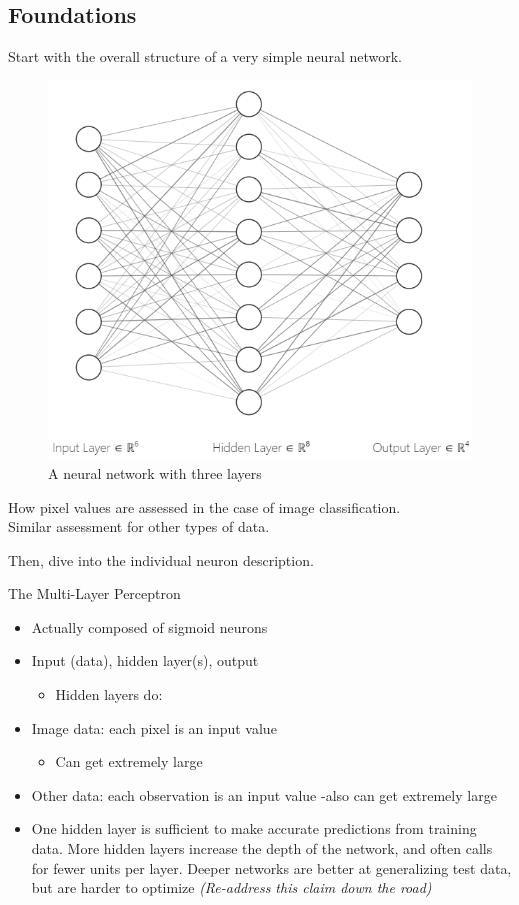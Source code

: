 

\hypertarget{foundations}{%
\subsection{Foundations}\label{foundations}}

Start with the overall structure of a very simple neural network.

\begin{figure}
    \centering
    \includegraphics[width=.4\textwidth]{Figures/NN_int.png}
    \caption*{\footnotesize{A neural network with three layers}}
\end{figure}

How pixel values are assessed in the case of image classification.\\
Similar assessment for other types of data.

Then, dive into the individual neuron description.

The Multi-Layer Perceptron

\begin{itemize}
\tightlist
\item
  Actually composed of sigmoid neurons
\item
  Input (data), hidden layer(s), output

  \begin{itemize}
  \tightlist
  \item
    Hidden layers do:
  \end{itemize}
\item
  Image data: each pixel is an input value

  \begin{itemize}
  \tightlist
  \item
    Can get extremely large
  \end{itemize}
\item
  Other data: each observation is an input value -also can get extremely
  large
\item
  One hidden layer is sufficient to make accurate predictions from
  training data. More hidden layers increase the depth of the network,
  and often calls for fewer units per layer. Deeper networks are better
  at generalizing test data, but are harder to optimize
  \cite{Goodfellow-et-al-2016} \emph{(Re-address this claim down the
  road)}
\end{itemize}

